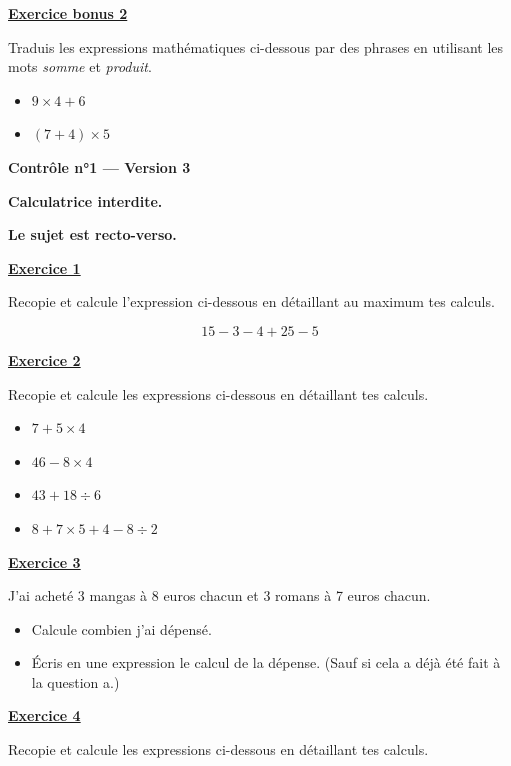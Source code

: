 \documentclass[13pt]{extarticle}
\newcommand{\exo}[1]{%
  \vspace{0.8em}%
  \noindent\large\underline{\textbf{Exercice #1}}%
  \vspace{0.2em}\par%
}
\newcommand{\exobonus}[1]{%
  \vspace{0.8em}%
  \noindent\large\underline{\textbf{Exercice bonus #1}}%
  \vspace{0.2em}\par%
}
\newcommand{\entetecontrole}[1]{%
\begin{center}
\textbf{\huge{Contrôle n°1 --- Version #1}}
\end{center}

\begin{center}
\textbf{Calculatrice interdite.}\par
\textbf{Le sujet est recto-verso.}

\end{center}
}
\begin{document}
\exobonus{2}

\noindent Traduis les expressions mathématiques ci-dessous par des phrases en utilisant les mots \emph{somme} et \emph{produit}.

\begin{itemize}
  \item[a)] $9 \times 4 + 6$
  \item[b)] $(7 + 4) \times 5$
\end{itemize}

\newpage

\entetecontrole{3}
\exo{1}

\noindent Recopie et calcule l'expression ci-dessous en détaillant au maximum tes calculs.

\[
15 - 3 - 4 + 25 - 5
\]

\exo{2}

\noindent Recopie et calcule les expressions ci-dessous en détaillant tes calculs.

\begin{itemize}
  \item[a)] $7 + 5 \times 4$
  \item[b)] $46 - 8 \times 4$
  \item[c)] $43 + 18 \div 6$
  \item[d)] $8 + 7 \times 5 + 4 - 8 \div 2$
\end{itemize}

\exo{3}

\noindent J'ai acheté 3 mangas à 8 euros chacun et 3 romans à 7 euros chacun.

\begin{itemize}
  \item[a)] Calcule combien j'ai dépensé.
  \item[b)] Écris en une expression le calcul de la dépense. (Sauf si cela a déjà été fait à la question a.)
\end{itemize}

\exo{4}

\noindent Recopie et calcule les expressions ci-dessous en détaillant tes calculs.
\end{document}
